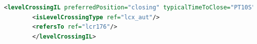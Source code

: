     \begin{lstlisting}[language = XML, caption = Clase \textit{LevelCrossingIL} , label = {lst:levelCrossingIL}]
	    <levelCrossingIL preferredPosition="closing" typicalTimeToClose="PT10S" id="il_lcr176">
	    <isLevelCrossingType ref="lcx_aut"/>
	    <refersTo ref="lcr176"/>
	    </levelCrossingIL>
    \end{lstlisting}